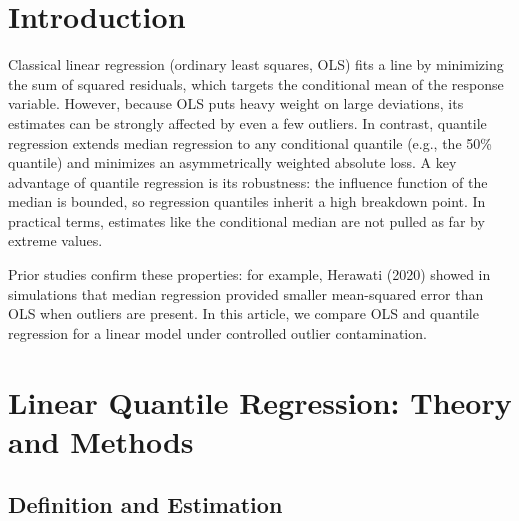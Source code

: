 \documentclass[fleqn,10pt]{latex/stylish_article} %
\affiliation{

}
\affiliation{*\textbf{}: } %
\begin{document}

\flushbottom %

\maketitle %

\tableofcontents %

\thispagestyle{empty} %


\section{Introduction}\label{introduction}

Classical linear regression (ordinary least squares, OLS) fits a line by minimizing the sum of squared residuals, which targets the conditional mean of the response variable. However, because OLS puts heavy weight on large deviations, its estimates can be strongly affected by even a few outliers. In contrast, quantile regression extends median regression to any conditional quantile (e.g., the 50\% quantile) and minimizes an asymmetrically weighted absolute loss. A key advantage of quantile regression is its robustness: the influence function of the median is bounded, so regression quantiles inherit a high breakdown point. In practical terms, estimates like the conditional median are not pulled as far by extreme values.

Prior studies confirm these properties: for example, Herawati (2020) showed in simulations that median regression provided smaller mean-squared error than OLS when outliers are present. In this article, we compare OLS and quantile regression for a linear model under controlled outlier contamination.

\section{Linear Quantile Regression: Theory and Methods}\label{linear-quantile-regression-theory-and-methods}

\subsection{Definition and Estimation}\label{definition-and-estimation}
\end{document}
